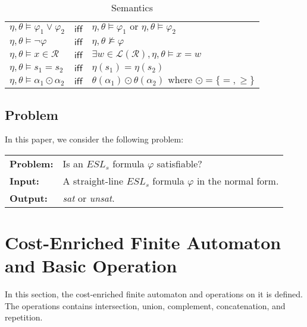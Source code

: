 \documentclass[runningheads]{llncs}
\newcommand*{\regex}{\mathcal{R}}
\newcommand*{\lan}{\mathcal{L}}
\begin{document}
\begin{table}[H]
  \centering
  \begin{tabular}{lcl}
     $\eta,\theta \models \varphi_1\vee \varphi_2$ & $\mathsf{iff}$ & $\eta,\theta \models \varphi_1 \text{ or } \eta,\theta \models \varphi_2$\\
     $\eta,\theta \models \neg\varphi $          & $\mathsf{iff}$ & $\eta,\theta \not\models \varphi$\\
     $\eta, \theta \models x\in \regex$            & $\mathsf{iff}$ & $\exists w \in \lan(\regex),\eta,\theta \models x = w$\\
     $\eta, \theta \models s_1 = s_2$              & $\mathsf{iff}$ & $\eta(s_1) = \eta(s_2)$\\
     $\eta, \theta \models \alpha_1\odot\alpha_2$  & $\mathsf{iff}$ & $\theta(\alpha_1) \odot \theta(\alpha_2) \text{ where } \odot = \{=, \geq \}$
  \end{tabular}
  \caption{Semantics}
  \label{tab:semantics}
\end{table}
\subsection{Problem}
In this paper, we consider the following problem:
\begin{table}[H]
  \centering
  \begin{tabular}{l l}
    \hline
    \textbf{Problem:} & Is an $ESL_s$ formula $\varphi$ satisfiable?                   \\
    \textbf{Input:}   & A straight-line $ESL_s$ formula $\varphi$ in the normal form. \\
    \textbf{Output:}  & \emph{sat} or \emph{unsat}.                               \\
    \hline
  \end{tabular}
\end{table}


\section{Cost-Enriched Finite Automaton and Basic Operation} \label{sec:cefa}
In this section, the cost-enriched finite automaton and operations on it is defined. The operations contains intersection, union, complement, concatenation, and repetition.
\end{document}
